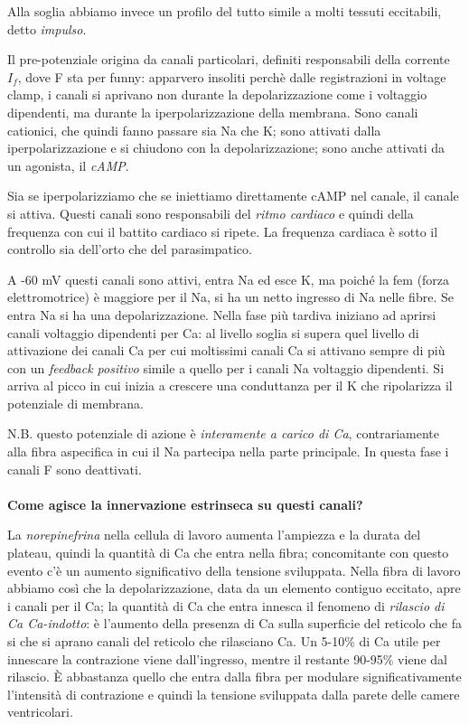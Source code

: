 \documentclass[a4paper,12pt]{article}
\begin{document}
Alla soglia abbiamo invece un profilo del tutto simile a molti tessuti eccitabili, detto \emph{impulso}.

Il pre-potenziale origina da canali particolari, definiti responsabili della corrente $I_{f}$, dove F sta per funny: apparvero insoliti perchè dalle registrazioni in voltage clamp, i canali si aprivano non durante la depolarizzazione come i voltaggio dipendenti, ma durante la iperpolarizzazione della membrana. Sono canali cationici, che quindi fanno passare sia Na che K; sono attivati dalla iperpolarizzazione e si chiudono con la depolarizzazione; sono anche attivati da un agonista, il \emph{cAMP}. 

Sia se iperpolarizziamo che se iniettiamo direttamente cAMP nel canale, il canale si attiva. Questi canali sono responsabili del \emph{ritmo cardiaco} e quindi della frequenza con cui il battito cardiaco si ripete. La frequenza cardiaca è sotto il controllo sia dell'orto che del parasimpatico.

A -60 mV questi canali sono attivi, entra Na ed esce K, ma poiché la fem (forza elettromotrice) è maggiore per il Na, si ha un netto ingresso di Na nelle fibre. Se entra Na si ha una depolarizzazione. Nella fase più tardiva iniziano ad aprirsi canali voltaggio dipendenti per Ca: al livello soglia si supera quel livello di attivazione dei canali Ca per cui moltissimi canali Ca si attivano sempre di più con un \emph{feedback positivo} simile a quello per i canali Na voltaggio dipendenti. Si arriva al picco in cui inizia a crescere una conduttanza per il K che ripolarizza il potenziale di membrana. 

N.B. questo potenziale di azione è \emph{interamente a carico di Ca}, contrariamente alla fibra aspecifica in cui il Na partecipa nella parte principale. In questa fase i canali F sono deattivati. 
\paragraph{} 
\textbf{Come agisce la innervazione estrinseca su questi canali?}

La \emph{norepinefrina} nella cellula di lavoro aumenta l'ampiezza e la durata del plateau, quindi la quantità di Ca che entra nella fibra; concomitante con questo evento c'è un aumento significativo della tensione sviluppata. Nella fibra di lavoro abbiamo così che la depolarizzazione, data da un elemento contiguo eccitato, apre i canali per il Ca; la quantità di Ca che entra innesca il fenomeno di \emph{rilascio di Ca Ca-indotto}: è l'aumento della presenza di Ca sulla superficie del reticolo che fa si che si aprano canali del reticolo che rilasciano Ca. Un 5-10\% di Ca utile per innescare la contrazione viene dall'ingresso, mentre il restante 90-95\% viene dal rilascio. È abbastanza quello che entra dalla fibra per modulare significativamente l'intensità di contrazione e quindi la tensione sviluppata dalla parete delle camere ventricolari.
\end{document}
